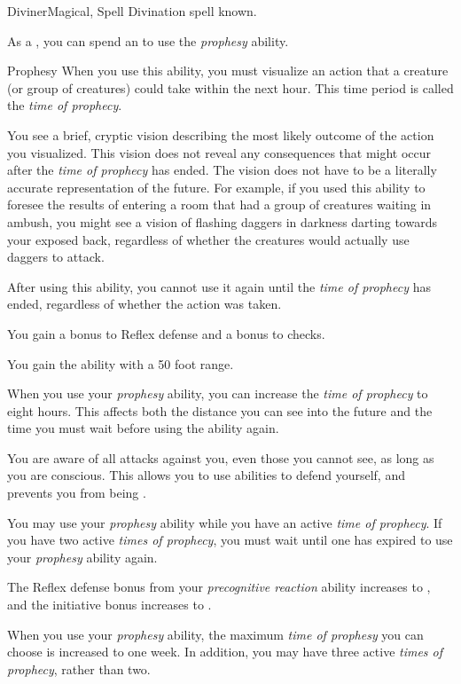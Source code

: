     \begin{feat}{Diviner}{Magical, Spell}
        \featpre Divination spell known.

         As a , you can spend an  to use the \textit{prophesy} ability.
        \begin{ability}{Prophesy}
            When you use this ability, you must visualize an action that a creature (or group of creatures) could take within the next hour.
            This time period is called the \textit{time of prophecy}.

            You see a brief, cryptic vision describing the most likely outcome of the action you visualized.
            This vision does not reveal any consequences that might occur after the \textit{time of prophecy} has ended.
            The vision does not have to be a literally accurate representation of the future.
            For example, if you used this ability to foresee the results of entering a room that had a group of creatures waiting in ambush, you might see a vision of flashing daggers in darkness darting towards your exposed back, regardless of whether the creatures would actually use daggers to attack.

            After using this ability, you cannot use it again until the \textit{time of prophecy} has ended, regardless of whether the action was taken.
        \end{ability}

         You gain a  bonus to Reflex defense and a  bonus to  checks.

         You gain the  ability with a 50 foot range.

         When you use your \textit{prophesy} ability, you can increase the \textit{time of prophecy} to eight hours.
        This affects both the distance you can see into the future and the time you must wait before using the ability again.

         You are aware of all attacks against you, even those you cannot see, as long as you are conscious.
        This allows you to use abilities to defend yourself, and prevents you from being \unaware.

         You may use your \textit{prophesy} ability while you have an active \textit{time of prophecy}.
        If you have two active \textit{times of prophecy}, you must wait until one has expired to use your \textit{prophesy} ability again.

         The Reflex defense bonus from your \textit{precognitive reaction} ability increases to , and the initiative bonus increases to .

         When you use your \textit{prophesy} ability, the maximum \textit{time of prophesy} you can choose is increased to one week.
        In addition, you may have three active \textit{times of prophecy}, rather than two.
    \end{feat}

